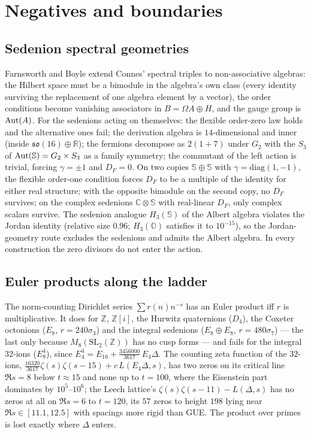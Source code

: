 \documentclass[11pt]{amsart}
\theoremstyle{definition}
\renewcommand{\O}{\mathbb{O}}\newcommand{\Sd}{\mathbb{S}}\newcommand{\Hq}{\mathbb{H}}\newcommand{\Z}{\mathbb{Z}}\newcommand{\Q}{\mathbb{Q}}\newcommand{\R}{\mathbb{R}}\newcommand{\C}{\mathbb{C}}\newcommand{\F}{\mathbb{F}}
\begin{document}
\section{Negatives and boundaries}\label{sec:negatives}
\subsection{Sedenion spectral geometries}
Farnsworth and Boyle \cite{FB13,BF14} extend Connes' spectral triples to non-associative algebras: the Hilbert space must be a bimodule in the algebra's own class (every identity surviving the replacement of one algebra element by a vector), the order conditions become vanishing associators in $B=\Omega A\oplus H$, and the gauge group is $\operatorname{Aut}(A)$. For the sedenions acting on themselves: the flexible order-zero law holds and the alternative ones fail; the derivation algebra is $14$-dimensional and inner (inside $\mathfrak{so}(16)\oplus\R$); the fermions decompose as $2(1+7)$ under $G_2$ with the $S_3$ of $\Aut(\Sd)=G_2\times S_3$ as a family symmetry; the commutant of the left action is trivial, forcing $\gamma=\pm 1$ and $D_F=0$. On two copies $\Sd\oplus\Sd$ with $\gamma=\mathrm{diag}(1,-1)$, the flexible order-one condition forces $D_F$ to be a multiple of the identity for either real structure; with the opposite bimodule on the second copy, no $D_F$ survives; on the complex sedenions $\C\otimes\Sd$ with real-linear $D_F$, only complex scalars survive. The sedenion analogue $H_3(\Sd)$ of the Albert algebra violates the Jordan identity (relative size $0.96$; $H_3(\O)$ satisfies it to $10^{-15}$), so the Jordan-geometry route \cite{BF14} excludes the sedenions and admits the Albert algebra. In every construction the zero divisors do not enter the action.
\subsection{Euler products along the ladder}
The norm-counting Dirichlet series $\sum r(n)n^{-s}$ has an Euler product iff $r$ is multiplicative. It does for $\Z$, $\Z[i]$, the Hurwitz quaternions ($D_4$), the Coxeter octonions ($E_8$, $r=240\sigma_3$) and the integral sedenions ($E_8\oplus E_8$, $r=480\sigma_7$) --- the last only because $M_8(\mathrm{SL}_2(\Z))$ has no cusp forms --- and fails for the integral $32$-ions ($E_8^4$), since $E_4^4=E_{16}+\tfrac{3456000}{3617}\,E_4\Delta$. The counting zeta function of the $32$-ions, $\tfrac{16320}{3617}\zeta(s)\zeta(s-15)+c\,L(E_4\Delta,s)$, has two zeros on its critical line $\Re s=8$ below $t\approx 15$ and none up to $t=100$, where the Eisenstein part dominates by $10^5$--$10^6$; the Leech lattice's $\zeta(s)\zeta(s-11)-L(\Delta,s)$ has no zeros at all on $\Re s=6$ to $t=120$, its $57$ zeros to height $198$ lying near $\Re s\in[11.1,12.5]$ with spacings more rigid than GUE. The product over primes is lost exactly where $\Delta$ enters.
\end{document}
